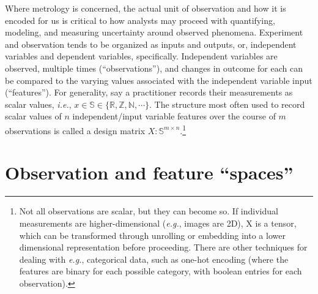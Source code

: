 \documentclass[%
	12pt,
		oneside,
		letterpaper
]{book}
\begin{document}
Where metrology is concerned, the actual unit of observation and how it
is encoded for us is critical to how analysts may proceed with
quantifying, modeling, and measuring uncertainty around observed
phenomena. Experiment and observation tends to be organized as inputs
and outputs, or, independent variables and dependent variables,
specifically. Independent variables are observed, multiple times
(``observations''), and changes in outcome for each can be compared to
the varying values associated with the independent variable input
(``features''). For generality, say a practitioner records their
measurements as scalar values, \emph{i.e.},
\(x\in\mathbb{S}\in\{\mathbb{R,Z,N},\cdots\}\). The structure most often
used to record scalar values of \(n\) independent/input variable
features over the course of \(m\) observations is called a design matrix
\(X:\mathbb{S}^{m\times n}\).\footnote{ Not all observations are scalar,
  but they can become so. If individual measurements are
  higher-dimensional (\emph{e.g.}, images are 2D), X is a tensor, which
  can be transformed through unrolling or embedding into a lower
  dimensional representation before proceeding. There are other
  techniques for dealing with \emph{e.g.}, categorical data, such as
  one-hot encoding (where the features are binary for each possible
  category, with boolean entries for each observation).}

\section{Observation and feature ``spaces''}\label{sec-matrix-notation}
\end{document}

